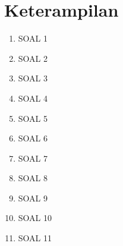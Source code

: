 \documentclass{article}
\begin{document}
\section{Keterampilan}
\begin{enumerate}
\item SOAL 1

\item SOAL 2

\item SOAL 3

\item SOAL 4

\item SOAL 5

\item SOAL 6

\item SOAL 7

\item SOAL 8

\item SOAL 9

\item SOAL 10

\item SOAL 11

\end{enumerate}
\end{document}
